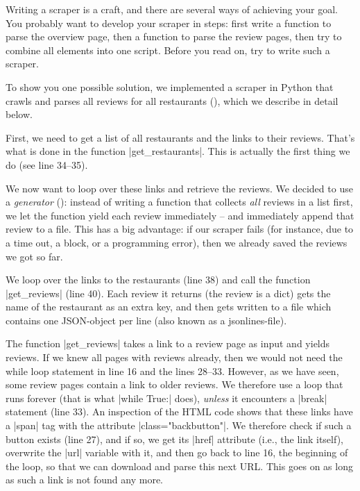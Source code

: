 Writing a scraper is a craft, and there are several ways of achieving your goal.
You probably want to develop your scraper in steps: first write a function to
parse the overview page, then a function to parse the review pages, then try
to combine all elements into one script. Before you read on, try to write
such a scraper.

To show you one possible solution, we implemented a scraper in Python
that crawls and parses all reviews for all restaurants
(), which we describe in detail below.


First, we need to get a list of all restaurants and the links to their
reviews. That's what is done in the function |get_restaurants|. This
is actually the first thing we do (see line 34--35).

We now want to loop over these links and retrieve the reviews.  We
decided to use a \emph{generator} (): instead of writing a
function that collects \emph{all} reviews in a list first, we let the
function yield each review immediately -- and immediately append that review
to a file. This has a big advantage: if our scraper fails (for
instance, due to a time out, a block, or a programming error), then we
already saved the reviews we got so far.

We loop over the links to the restaurants (line 38) and call the
function |get_reviews| (line 40). Each review it returns (the review
is a dict) gets the name of the restaurant as an extra key, and then
gets written to a file which contains one JSON-object per line (also
known as a jsonlines-file).

The function |get_reviews| takes a link to a review page as input and
yields reviews. If we knew all pages with reviews already, then we
would not need the while loop statement in line 16 and the lines
28--33. However, as we have seen, some review pages contain a link to
older reviews. We therefore use a loop that runs forever (that is what
|while True:| does), \emph{unless} it encounters a |break| statement
(line 33).  An inspection of the HTML code shows that these links have
a |span| tag with the attribute |class="backbutton"|. We therefore
check if such a button exists (line 27), and if so, we get its |href|
attribute (i.e., the link itself), overwrite the |url| variable with
it, and then go back to line 16, the beginning of the loop, so that we
can download and parse this next URL.  This goes on as long as such a
link is not found any more.



